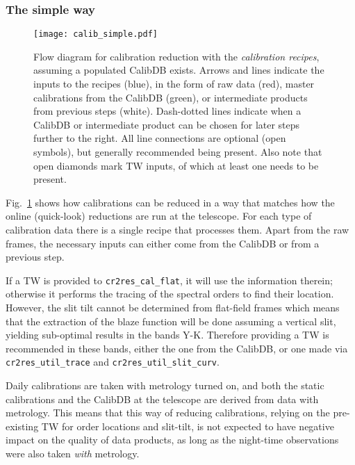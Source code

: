 \subsubsection{The simple way}
\label{sec:simplecalib}
\begin{figure}[!tb]
    \begin{center}
        \texttt{[image: calib\_simple.pdf]}
    \end{center}
    \caption{
        \label{fig:calibflow_simple}
        Flow diagram for calibration reduction with the \textit{calibration
        recipes}, assuming a populated CalibDB exists. Arrows and lines indicate
        the inputs to the recipes (blue), in the form of raw data (red), master
        calibrations from the CalibDB (green), or intermediate products from
        previous steps (white). Dash-dotted lines indicate when a CalibDB or
        intermediate product can be chosen for later steps further to the right.
        All line connections are optional (open symbols), but generally
        recommended being present. Also note that open diamonds mark TW inputs,
        of which at least one needs to be present.
    }
\end{figure}

Fig.~\ref{fig:calibflow_simple} shows how calibrations can be reduced in a way
that matches how the online (quick-look) reductions are run at the telescope.
For each type of calibration data there is a single recipe that processes them.
Apart from the raw frames, the necessary inputs can either come from the CalibDB
or from a previous step.


If a TW is provided to \texttt{cr2res\_cal\_flat}, it will use the information
therein; otherwise it performs the tracing of the spectral orders to find their
location. However, the slit tilt cannot be determined from flat-field frames
which means that the extraction of the blaze function will be done assuming a
vertical slit, yielding sub-optimal results in the bands Y-K. Therefore
providing a TW is recommended in these bands, either the one from the CalibDB,
or one made via \texttt{cr2res\_util\_trace} and
\texttt{cr2res\_util\_slit\_curv}.

Daily calibrations are taken with metrology turned on, and both the static
calibrations and the CalibDB at the telescope are derived from data with
metrology. This means that this way of reducing calibrations, relying on the
pre-existing TW for order locations and slit-tilt, is not expected to have
negative impact on the quality of data products, as long as the night-time
observations were also taken \emph{with} metrology.

